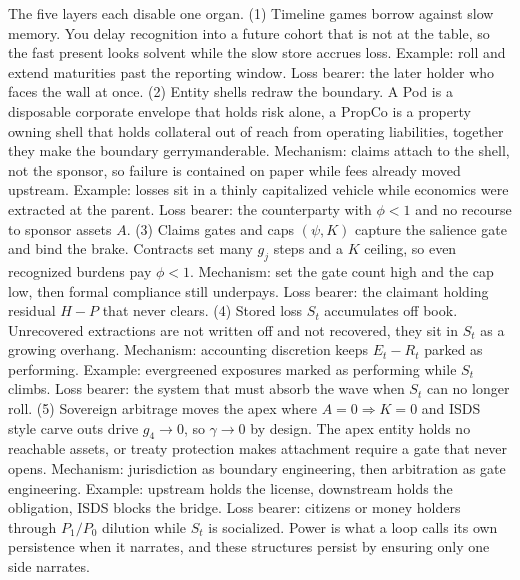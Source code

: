 \documentclass[11pt]{article}
\begin{document}
The five layers each disable one organ. (1) Timeline games borrow against slow memory. You delay recognition into a future cohort that is not at the table, so the fast present looks solvent while the slow store accrues loss. Example: roll and extend maturities past the reporting window. Loss bearer: the later holder who faces the wall at once. (2) Entity shells redraw the boundary. A Pod is a disposable corporate envelope that holds risk alone, a PropCo is a property owning shell that holds collateral out of reach from operating liabilities, together they make the boundary gerrymanderable. Mechanism: claims attach to the shell, not the sponsor, so failure is contained on paper while fees already moved upstream. Example: losses sit in a thinly capitalized vehicle while economics were extracted at the parent. Loss bearer: the counterparty with $\phi<1$ and no recourse to sponsor assets $A$. (3) Claims gates and caps $(\psi,K)$ capture the salience gate and bind the brake. Contracts set many $g_j$ steps and a $K$ ceiling, so even recognized burdens pay $\phi<1$. Mechanism: set the gate count high and the cap low, then formal compliance still underpays. Loss bearer: the claimant holding residual $H-P$ that never clears. (4) Stored loss $S_t$ accumulates off book. Unrecovered extractions are not written off and not recovered, they sit in $S_t$ as a growing overhang. Mechanism: accounting discretion keeps $E_t-R_t$ parked as performing. Example: evergreened exposures marked as performing while $S_t$ climbs. Loss bearer: the system that must absorb the wave when $S_t$ can no longer roll. (5) Sovereign arbitrage moves the apex where $A=0\Rightarrow K=0$ and ISDS style carve outs drive $g_4\to0$, so $\gamma\to0$ by design. The apex entity holds no reachable assets, or treaty protection makes attachment require a gate that never opens. Mechanism: jurisdiction as boundary engineering, then arbitration as gate engineering. Example: upstream holds the license, downstream holds the obligation, ISDS blocks the bridge. Loss bearer: citizens or money holders through $P_1/P_0$ dilution while $S_t$ is socialized. Power is what a loop calls its own persistence when it narrates, and these structures persist by ensuring only one side narrates.
\end{document}
